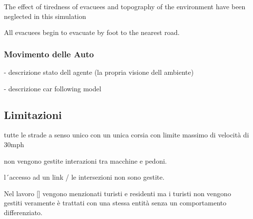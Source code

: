 The effect of tiredness of evacuees and topography of the
environment have been neglected in this simulation

All evacuees begin to evacuate by
foot to the nearest road.

\subsubsection{Movimento delle Auto}
- descrizione stato dell agente (la propria visione dell ambiente)

- descrizione car following model

\subsection{Limitazioni}

tutte le strade a senso unico con un unica corsia
con limite massimo di velocità di 30mph

non vengono gestite interazioni tra macchine e pedoni.

l´accesso ad un link / le intersezioni non sono gestite.

Nel lavoro [] vengono menzionati turisti e residenti
ma i turisti non vengono gestiti veramente è trattati
con una stessa entità senza un comportamento differenziato.